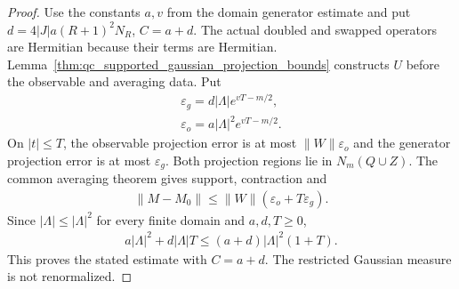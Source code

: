 \begin{proof}\leanok
    Use the constants $a,v$ from the domain generator estimate and put
    $d=4|J|a(R+1)^2N_R$, $C=a+d$. The actual doubled and swapped operators
    are Hermitian because their terms are Hermitian.
    Lemma~\ref{thm:qc_supported_gaussian_projection_bounds} constructs $U$
    before the observable and averaging data.
    Put
    \begin{align*}
        \varepsilon_g=d|\Lambda|e^{vT-m/2}, \\
        \varepsilon_o=a|\Lambda|^2e^{vT-m/2}.
    \end{align*}
    On $|t|\le T$, the observable projection error is at most
    $\|W\|\varepsilon_o$ and the generator projection error is at most
    $\varepsilon_g$. Both projection regions lie in $N_m(Q\cup Z)$.
    The common averaging theorem gives support, contraction and
    \begin{align*}
        \|M-M_0\|\le\|W\|(\varepsilon_o+T\varepsilon_g).
    \end{align*}
    Since $|\Lambda|\le|\Lambda|^2$ for every finite domain and $a,d,T\ge0$,
    \begin{align*}
        a|\Lambda|^2+d|\Lambda|T\le(a+d)|\Lambda|^2(1+T).
    \end{align*}
    This proves the stated estimate with $C=a+d$.
    The restricted Gaussian measure is not renormalized.
\end{proof}

